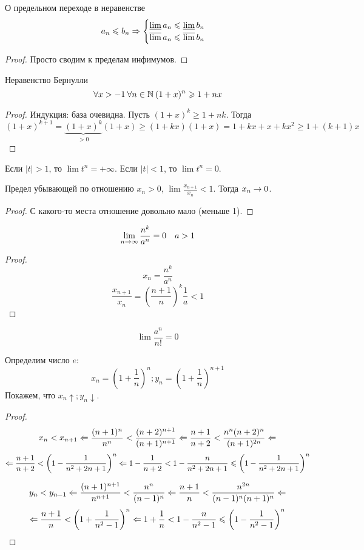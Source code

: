 \begin{theorem}{О предельном переходе в неравенстве}
$$a_n \leqslant b_n \Rightarrow \begin{cases}\varliminf a_n \leqslant \varliminf b_n \\ \varlimsup a_n \leqslant \varlimsup b_n\end{cases}$$
\end{theorem}                                                                                                                       
\begin{proof}
Просто сводим к пределам инфимумов. 
\end{proof}

\begin{theorem}{Неравенство Бернулли}
$$\forall x>-1\: \forall n \in \mathbb{N}\: (1+x)^n \geqslant 1 + nx$$
\end{theorem}
\begin{proof}
Индукция: база очевидна. Пусть $(1+x)^k \geqslant 1 + nk$. Тогда
$$(1+x)^{k+1} = \underbrace{(1+x)^k}_{>0} (1+x) \geqslant (1+kx)(1+x) = 1 + kx + x + kx^2 \geqslant 1 + (k+1)x$$
\end{proof}
\begin{conseq}
Если $|t| > 1$, то $\lim t^n = +\infty$. Если $|t| < 1$, то $\lim t^n = 0$.
\end{conseq}

\begin{theorem}{Предел убывающей по отношению}
$x_n > 0$, $\lim \frac{x_{n+1}}{x_n} < 1$. Тогда $x_n \rightarrow 0$.
\end{theorem}
\begin{proof}
С какого-то места отношение довольно мало (меньше 1).
\end{proof}
\begin{conseq}
$$\lim_{n\rightarrow\infty} \frac{n^k}{a^n} = 0\quad a>1$$
\end{conseq}
\begin{proof}
$$x_n = \frac{n^k}{a^n}$$
$$\frac{x_{n+1}}{x_n} = \left(\frac{n+1}n\right)^k \frac1a < 1$$
\end{proof}
\begin{conseq}
$$\lim \frac{a^n}{n!} = 0$$
\end{conseq}

Определим число $e$:
$$x_n = \left(1+\frac1n\right)^n; y_n=\left(1+\frac1n\right)^{n+1}$$
Покажем, что $x_n \uparrow; y_n \downarrow$.
\begin{proof}
$$x_n < x_{n+1} \Leftarrow \frac{(n+1)^n}{n^n} < \frac{(n+2)^{n+1}}{(n+1)^{n+1}} \Leftarrow \frac{n+1}{n+2} < \frac{n^n(n+2)^n}{(n+1)^{2n}} \Leftarrow $$
$$ \Leftarrow \frac{n+1}{n+2} < \left(1-\frac1{n^2+2n+1}\right)^n \Leftarrow 1 - \frac{1}{n+2} < 1 - \frac{n}{n^2+2n+1} \leqslant \left(1-\frac1{n^2+2n+1}\right)^n$$

$$y_n < y_{n-1} \Leftarrow \frac{(n+1)^{n+1}}{n^{n+1}} < \frac{n^n}{(n-1)^n} \Leftarrow \frac{n+1}{n} < \frac{n^{2n}}{(n-1)^n(n+1)^n} \Leftarrow $$
$$\Leftarrow \frac{n+1}{n} < \left(1+\frac1{n^2-1}\right)^n \Leftarrow 1 + \frac1n < 1 - \frac{n}{n^2-1} \leqslant \left(1-\frac1{n^2-1}\right)^n$$
\end{proof}

